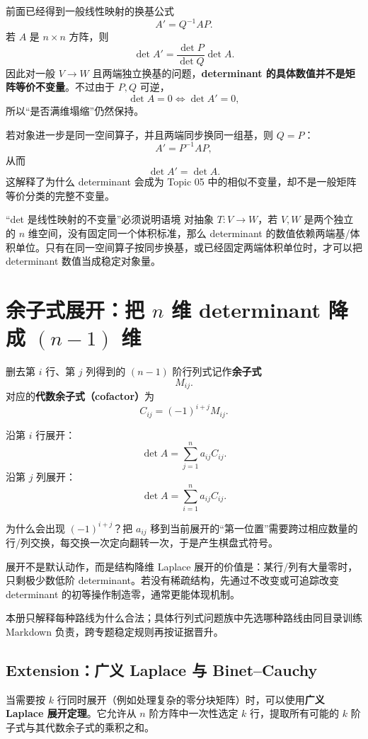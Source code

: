 \documentclass[11pt,a4paper]{ctexart}
\newcommand{\kw}[1]{\textbf{\color{deep}#1}}
\begin{document}
前面已经得到一般线性映射的换基公式
\[
A'=Q^{-1}AP.
\]
若 $A$ 是 $n\times n$ 方阵，则
\[
\det A'
=\frac{\det P}{\det Q}\det A.
\]
因此对一般 $V\to W$ 且两端独立换基的问题，\kw{determinant 的具体数值并不是矩阵等价不变量}。不过由于 $P,Q$ 可逆，
\[
\det A=0\iff\det A'=0,
\]
所以“是否满维塌缩”仍然保持。

若对象进一步是同一空间算子，并且两端同步换同一组基，则 $Q=P$：
\[
A'=P^{-1}AP,
\]
从而
\[
\boxed{\det A'=\det A.}
\]
这解释了为什么 determinant 会成为 Topic 05 中的相似不变量，却不是一般矩阵等价分类的完整不变量。

\begin{warnbox}{“det 是线性映射的不变量”必须说明语境}
对抽象 $T:V\to W$，若 $V,W$ 是两个独立的 $n$ 维空间，没有固定同一个体积标准，那么 determinant 的数值依赖两端基/体积单位。只有在同一空间算子按同步换基，或已经固定两端体积单位时，才可以把 determinant 数值当成稳定对象量。
\end{warnbox}

\section{余子式展开：把 $n$ 维 determinant 降成 $(n-1)$ 维}

删去第 $i$ 行、第 $j$ 列得到的 $(n-1)$ 阶行列式记作\kw{余子式}
\[
M_{ij}.
\]
对应的\kw{代数余子式（cofactor）}为
\[
C_{ij}=(-1)^{i+j}M_{ij}.
\]

沿第 $i$ 行展开：
\[
\boxed{\det A=\sum_{j=1}^{n}a_{ij}C_{ij}.}
\]
沿第 $j$ 列展开：
\[
\boxed{\det A=\sum_{i=1}^{n}a_{ij}C_{ij}.}
\]

为什么会出现 $(-1)^{i+j}$？把 $a_{ij}$ 移到当前展开的“第一位置”需要跨过相应数量的行/列交换，每交换一次定向翻转一次，于是产生棋盘式符号。

\begin{methodbox}{展开不是默认动作，而是结构降维}
Laplace 展开的价值是：某行/列有大量零时，只剩极少数低阶 determinant。若没有稀疏结构，先通过不改变或可追踪改变 determinant 的初等操作制造零，通常更能体现机制。

本册只解释每种路线为什么合法；具体行列式问题族中先选哪种路线由同目录训练 Markdown 负责，跨专题稳定规则再按证据晋升。
\end{methodbox}

\subsection{Extension：广义 Laplace 与 Binet--Cauchy}

当需要按 $k$ 行同时展开（例如处理复杂的零分块矩阵）时，可以使用\kw{广义 Laplace 展开定理}。它允许从 $n$ 阶方阵中一次性选定 $k$ 行，提取所有可能的 $k$ 阶子式与其代数余子式的乘积之和。
\end{document}
